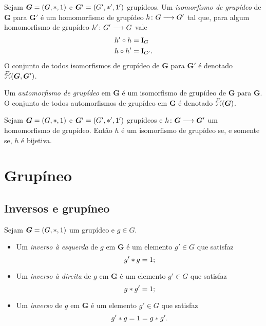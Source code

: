 \begin{definition}
Sejam $\bm G=(G,\ast,1)$ e $\bm G'=(G',\ast',1')$ grupídeos. Um \emph{isomorfismo de grupídeo} de $\bm G$ para $\bm G'$ é um homomorfismo de grupídeo $h\colon \allowbreak G \longrightarrow G'$ tal que, para algum homomorfismo de grupídeo $h'\colon \allowbreak G' \longrightarrow G$ vale
	\begin{align*}
	h' \circ h &= \mathrm{I}_{G} \\
	h \circ h' &= \mathrm{I}_{G'}.
	\end{align*}
O conjunto de todos isomorfismos de grupídeo de $\bm G$ para $\bm G'$ é denotado $\accentset{\leftrightarrow}{\mathcal{H}}(\bm G,\bm G')$.

Um \emph{automorfismo de grupídeo} em $\bm G$ é um isomorfismo de grupídeo de $\bm G$ para $\bm G$. O conjunto de todos automorfismos de grupídeo em $\bm G$ é denotado $\accentset{\leftrightarrow}{\mathcal{H}}(\bm G)$.
\end{definition}

\begin{exercise}
Sejam $\bm G=(G,\ast,1)$ e $\bm G'=(G',\ast',1')$ grupídeos e $h\colon \allowbreak \bm G  \longrightarrow \bm G'$ um homomorfismo de grupídeo. Então $h$ é um isomorfismo de grupídeo se, e somente se, $h$ é bijetiva.
\end{exercise}

\section{Grupíneo}

\subsection{Inversos e grupíneo}

\begin{definition}[Inverso]
Sejam $\bm G = (G,\ast,1)$ um grupídeo e $g \in G$.
	\begin{itemize}
	\item Um \emph{inverso à esquerda} de $g$ em $\bm G$ é um elemento $g' \in G$ que satisfaz
		\begin{equation*}
		g' \ast g = 1;
		\end{equation*}

	\item Um \emph{inverso à direita} de $g$ em $\bm G$ é um elemento $g' \in G$ que satisfaz
		\begin{equation*}
		g \ast g' = 1;
		\end{equation*}

	\item Um \emph{inverso} de $g$ em $\bm G$ é um elemento $g' \in G$ que satisfaz
		\begin{equation*}
		g' \ast g = 1 = g \ast g'.
		\end{equation*}
	\end{itemize}
\end{definition}

